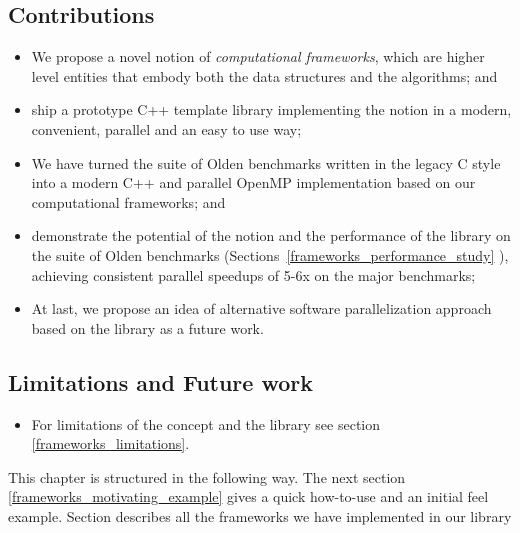 \subsection{Contributions}
\begin{itemize}[style=unboxed,leftmargin=0cm]
\itemsep0em
\renewcommand\labelitemi{$\vartriangleright$}
\renewcommand\labelitemii{$\bullet$}
\item We propose a novel notion of \textit{computational frameworks}, which are higher level entities that embody both the data structures and the algorithms; and
\item ship a prototype C++ template library implementing the notion in a modern, convenient, parallel and an easy to use way;
\item We have turned the suite of Olden benchmarks written in the legacy C style into a modern C++ and parallel OpenMP implementation based on our computational frameworks; and
\item demonstrate the potential of the notion and the performance of the library on the suite of Olden benchmarks (Sections~\ref{frameworks_performance_study} ), achieving consistent parallel speedups of 5-6x on the major benchmarks;
\item At last, we propose an idea of alternative software parallelization approach based on the library as a future work.
\end{itemize}

\subsection{Limitations and Future work}
\begin{itemize}[style=unboxed,leftmargin=0cm]
\itemsep0em
\renewcommand\labelitemi{$\vartriangleright$}
\renewcommand\labelitemii{$\bullet$}
\item For limitations of the concept and the library see section \ref{frameworks_limitations}.
\end{itemize}
\quad This chapter is structured in the following way. The next section \ref{frameworks_motivating_example} gives a quick how-to-use and an initial feel example. Section describes all the frameworks we have implemented in our library

